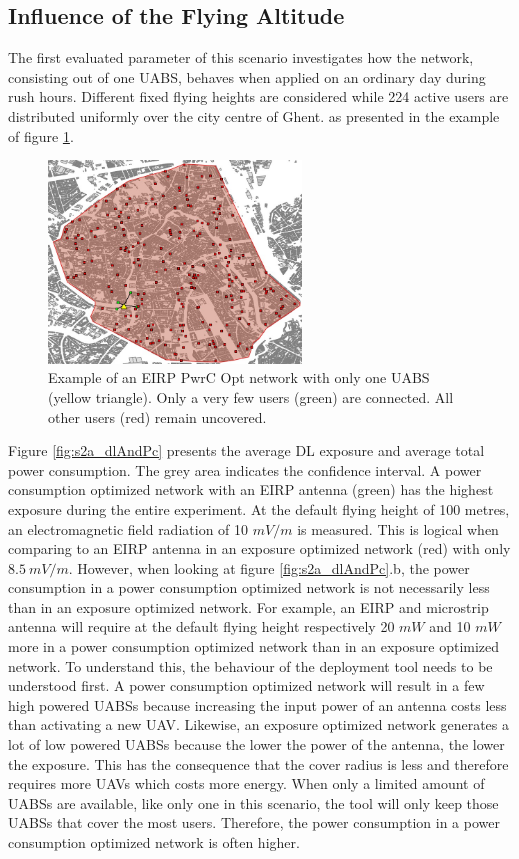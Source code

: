 \subsection{Influence of the Flying Altitude}
The first evaluated parameter of this scenario investigates how the network, consisting out of one \acs{UABS}, behaves when applied on an ordinary day during rush hours. 
Different fixed flying heights are considered while 224 active users are distributed uniformly over the city centre of Ghent. 
as presented in the example of figure \ref{fig:s2a:distribution}.
\begin{figure}[h]
  \centering
  \includegraphics[width=0.6\textwidth]{../images/ghentDistribution_pcEIRP_1drone.jpg}
  \caption{Example of an EIRP \gls{PwrC Opt} network with only one \acs{UABS} (yellow triangle). Only a very few users (green) are connected.
  All other users (red) remain uncovered.}
  \label{fig:s2a:distribution}
\end{figure}

Figure \ref{fig:s2a_dlAndPc} presents the average \gls{DL} exposure and average total power consumption. The grey area indicates the confidence interval. 
A power consumption optimized network with an \gls{EIRP} antenna (green) has the highest exposure during the 
entire experiment. At the default flying height of 100 metres, an electromagnetic field radiation 
of 10 $mV/m$ is measured.
This is logical when comparing to an EIRP antenna in an exposure optimized network (red) with only $8.5\ mV/m$. 
However, when looking at figure \ref{fig:s2a_dlAndPc}.b, the power consumption in a power consumption optimized network is not necessarily less 
than in an exposure optimized network. 
For example, an \gls{EIRP} and microstrip antenna will require at the default flying height respectively
20 $mW$ and 10 $mW$ more in a power consumption optimized network than in an exposure optimized network.
To understand this, the behaviour of the deployment tool needs to be understood first. 
A power consumption optimized network will result in a few high powered \gls{UABS}s because increasing the input power of an antenna costs 
less than activating a new  \gls{UAV}. Likewise, an exposure optimized network 
generates a lot of low powered \gls{UABS}s because the lower the power of the antenna, the lower the exposure. This has the consequence that the cover radius 
is less and therefore requires more \gls{UAV}s which costs more energy.
When only a limited amount of \gls{UABS}s are available, 
like only one in this scenario, the tool will only keep those \gls{UABS}s that cover the most users. 
Therefore, the power consumption in a power consumption optimized network is often higher. 

